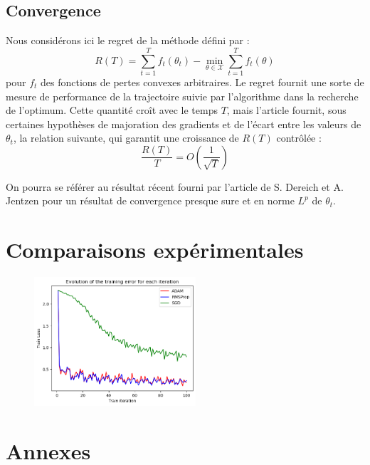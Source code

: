 \documentclass[11pt,a4paper, french]{article}
\newcommand{\dsum}[2]{\displaystyle\sum_{#1}^{#2}}
\begin{document}
\subsection{Convergence}

Nous considérons ici le regret de la méthode défini par : 
$$R(T)=\dsum{t=1}Tf_t(\theta_t)-\min_{\theta\in\mathcal X}\dsum{t=1}Tf_t(\theta)$$
pour $f_t$ des fonctions de pertes convexes arbitraires. Le regret fournit une sorte de mesure de performance de la trajectoire suivie par l'algorithme dans la recherche de l'optimum. Cette quantité croît avec le temps $T$, mais l'article fournit, sous certaines hypothèses de majoration des gradients et de l'écart entre les valeurs de $\theta_t$,  la relation suivante, qui garantit une croissance de $R(T)$ contrôlée :
$$\dfrac{R(T)}{T}=O\left(\dfrac 1{\sqrt T}\right)$$

On pourra se référer au résultat récent fourni par l'article de S. Dereich et A. Jentzen \cite{dereich2024convergenceratesadamoptimizer} pour un résultat de convergence presque sure et en norme $L^p$ de $\theta_t$. 

\section{Comparaisons expérimentales}



\begin{figure}[ht]
\centering
 \includegraphics[width=6cm]{illu_1.png}
\caption{}
\label{fig1}
\end{figure}



\nocite{kingma2017adammethodstochasticoptimization}
\nocite{starmer2023optimization}
\nocite{dereich2024convergenceratesadamoptimizer}
\renewcommand{\refname}{Sources}

\newpage

\section{Annexes}
\end{document}
